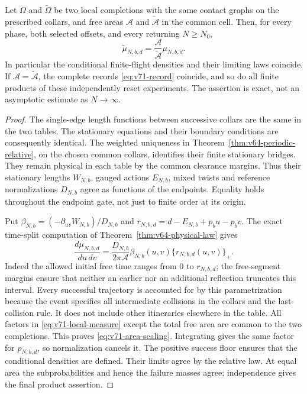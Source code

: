 \begin{proposition}
\label{prop:v71-locality}
Let $\Omega$ and $\widetilde\Omega$ be two local completions with the
same contact graphs on the prescribed collars, and free areas
$\mathcal A$ and $\widetilde{\mathcal A}$ in the common cell.  Then, for
every phase, both selected offsets, and every returning $N\ge N_0$,
\begin{equation}\label{eq:v71-area-scaling}
 \widetilde\mu_{N,b,d}
       =\frac{\mathcal A}{\widetilde{\mathcal A}}\mu_{N,b,d}.
\end{equation}
In particular the conditional finite-flight densities and their limiting
laws coincide.  If $\mathcal A=\widetilde{\mathcal A}$, the complete
records \eqref{eq:v71-record} coincide, and so do all finite products of
these independently reset experiments.  The assertion is exact, not an
asymptotic estimate as $N\to\infty$.
\end{proposition}
\begin{proof}
The single-edge length functions between successive collars are the
same in the two tables.  The stationary equations and their boundary
conditions are consequently identical.  The weighted uniqueness in
Theorem~\ref{thm:v64-periodic-relative}, on the chosen common collars, identifies
their finite stationary bridges.  They remain physical in each table by
the common clearance margins.  Thus their stationary lengths $W_{N,b}$,
gauged actions $E_{N,b}$, mixed twists and reference normalizations
$D_{N,b}$ agree as functions of the endpoints.  Equality holds throughout
the endpoint gate, not just to finite order at its origin.

Put $\beta_{N,b}=(-\partial_{uv}W_{N,b})/D_{N,b}$ and
$r_{N,b,d}=d-E_{N,b}+p_bu-p_bv$.  The exact time-split computation of
Theorem~\ref{thm:v64-physical-law} gives
\begin{equation}\label{eq:v71-local-measure}
 \frac{d\mu_{N,b,d}}{du\,dv}
   =\frac{D_{N,b}}{2\pi\mathcal A}
       \beta_{N,b}(u,v)\{r_{N,b,d}(u,v)\}_+.
\end{equation}
Indeed the allowed initial free time ranges from $0$ to $r_{N,b,d}$;
the free-segment margins ensure that neither an earlier nor an additional
reflection truncates this interval.  Every successful trajectory is
accounted for by this parametrization because the event specifies all
intermediate collisions in the collars and the last-collision rule.
It does not include other itineraries elsewhere in the table.  All
factors in \eqref{eq:v71-local-measure} except the total free area are
common to the two completions.  This proves
\eqref{eq:v71-area-scaling}.  Integrating gives the same factor for
$p_{N,b,d}$, so normalization cancels it.  The positive success floor
ensures that the conditional densities are defined.  Their limits agree
by the relative law.  At equal area the subprobabilities and hence the
failure masses agree; independence gives the final product assertion.
\end{proof}

